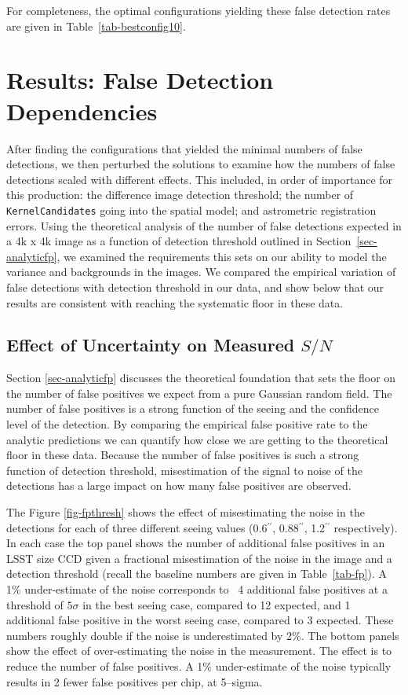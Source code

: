 \documentclass[prd, nofootinbib, floatfix, 11pt,tightenlines,times]{article}
\begin{document}
For completeness, the optimal configurations yielding these false
detection rates are given in Table~\ref{tab-bestconfig10}.

\section{Results: False Detection Dependencies}

After finding the configurations that yielded the minimal numbers of
false detections, we then perturbed the solutions to examine how the
numbers of false detections scaled with different effects.  This
included, in order of importance for this production: the difference
image detection threshold; the number of {\tt KernelCandidates} going
into the spatial model; and astrometric registration errors.  Using
the theoretical analysis of the number of false detections
expected in a 4k x 4k image as a function of detection threshold outlined in
Section~\ref{sec-analyticfp}, we examined the requirements this sets
on our ability to model the variance and backgrounds in the images.
We compared the empirical variation of false detections with detection
threshold in our data, and show below that our results are consistent with
reaching the systematic floor in these data.

\subsection{Effect of Uncertainty on Measured ${S/N}$ \label{sec-sn}}

Section \ref{sec-analyticfp} discusses the theoretical foundation 
that sets the floor on the number of false positives we expect from a 
pure Gaussian random field.  The number of false positives is a strong
function of the seeing and the confidence level of the detection.  
By comparing the empirical false positive rate to the analytic predictions
we can quantify how close we are getting to the theoretical floor in these
data.  Because the number of false positives is such a strong function of
detection threshold, misestimation of the signal to noise of the detections
has a large impact on how many false positives are observed.  

The Figure \ref{fig-fpthresh} shows the 
effect of misestimating the noise in the detections for each of three different
seeing values (0.6$^{\prime\prime}$, 0.88$^{\prime\prime}$, 1.2$^{\prime\prime}$ respectively).  In each case the top panel shows
the number of additional false positives in an LSST size CCD given a fractional misestimation
of the noise in the image and a detection threshold (recall the baseline numbers are given in 
Table~\ref{tab-fp}).  A 1\% under-estimate of the noise
corresponds to ~4 additional false positives at a threshold of $5\sigma$ in the best seeing case, compared to
12 expected, and 1 additional false positive in the worst seeing case, compared to 3 expected.  These numbers roughly
double if the noise is underestimated by 2\%.
The bottom panels show 
the effect of over-estimating the noise in the measurement.  The effect is to reduce
the number of false positives.  A 1\% under-estimate of the noise typically results in 2 fewer false positives
per chip, at 5--sigma.
\end{document}
